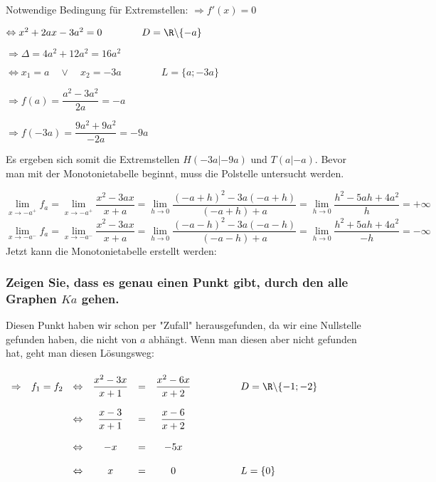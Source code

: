 \documentclass[main.tex]{subfiles}
\begin{document}
Notwendige Bedingung für Extremstellen: $\Rightarrow f'(x)=0$

$\Leftrightarrow x^2+2ax-3a^2 = 0 \qquad \qquad D= \R \backslash\{ -a \}$

$\Rightarrow \Delta = 4a^2 +12a^2 = 16a^2$

$\Leftrightarrow x_{1}=a \quad \lor \quad x_{2}=-3a \qquad \qquad L=\{a;-3a\}$

$\Rightarrow f(a)=\dfrac{a^2-3a^2}{2a} = -a$

$\Rightarrow f(-3a)= \dfrac{9a^2+9a^2}{-2a} = -9a$

Es ergeben sich somit die Extremstellen $H(-3a|-9a)$ und $T(a|-a)$. Bevor man mit der Monotonietabelle beginnt, muss die Polstelle untersucht werden.

$$\lim\limits_{x \rightarrow {-a^+}}{f_{a}} = \lim\limits_{x \rightarrow {-a^+}}{\dfrac{x^2-3ax}{x+a}} =\lim\limits_{h \rightarrow {0}}{\dfrac{(-a+h)^2 -3a(-a+h)}{(-a+h)+a}} = \lim\limits_{h \rightarrow {0}}{\dfrac{h^2-5ah+4a^2}{h}} = + \infty$$
$$\lim\limits_{x \rightarrow {-a^-}}{f_{a}} = \lim\limits_{x \rightarrow {-a^-}}{\dfrac{x^2-3ax}{x+a}} =\lim\limits_{h \rightarrow {0}}{\dfrac{(-a-h)^2 -3a(-a-h)}{(-a-h)+a}} = \lim\limits_{h \rightarrow {0}}{\dfrac{h^2+5ah+4a^2}{-h}} = - \infty$$
Jetzt kann die Monotonietabelle erstellt werden:


\subsubsection{Zeigen Sie, dass es genau einen Punkt gibt, durch den alle Graphen $Ka$ gehen.}

Diesen Punkt haben wir schon per "Zufall" herausgefunden, da wir eine Nullstelle gefunden haben, die nicht von $a$ abhängt. Wenn man diesen aber nicht gefunden hat, geht man diesen Lösungsweg:\\\\

$\begin{array}{rcccccl}
	\Rightarrow & f_{1}=f_{2} & \Leftrightarrow & \dfrac{x^2-3x}{x+1} & = & \dfrac{x^2-6x}{x+2} & \qquad \qquad D=\R \backslash \{-1;-2\} \\ \\
	&&\Leftrightarrow& \dfrac{x-3}{x+1} &=& \dfrac{x-6}{x+2}&  \\\\
	&&\Leftrightarrow& -x & = & -5x &\\ \\
	&&\Leftrightarrow& x &=& 0 & \qquad \qquad L=\{ 0 \} \\
\end{array}$
\end{document}
